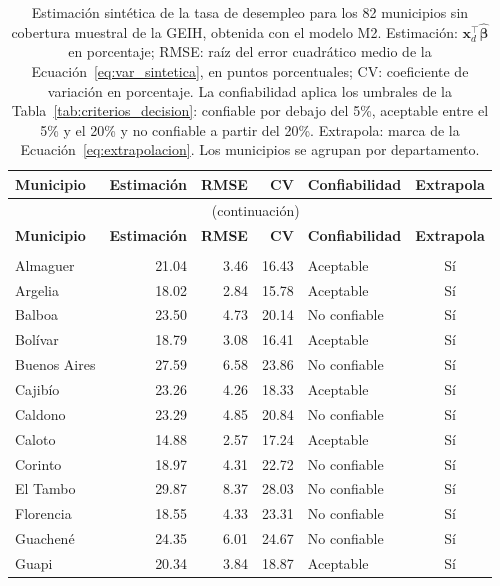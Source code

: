 \small
\begin{longtable}{p{3.4cm} r r r l c}
\caption{Estimación sintética de la tasa de desempleo para los 82 municipios sin cobertura
muestral de la GEIH, obtenida con el modelo M2. Estimación: $\mathbf{x}_d^\top\hat{\boldsymbol{\beta}}$
en porcentaje; RMSE: raíz del error cuadrático medio de la Ecuación~\ref{eq:var_sintetica}, en
puntos porcentuales; CV: coeficiente de variación en porcentaje. La confiabilidad aplica los
umbrales de la Tabla~\ref{tab:criterios_decision}: confiable por debajo del 5\%, aceptable entre el
5\% y el 20\% y no confiable a partir del 20\%. Extrapola: marca de la
Ecuación~\ref{eq:extrapolacion}. Los municipios se agrupan por departamento.}
\label{tab:prediccion_sintetica} \\
\toprule
\textbf{Municipio} & \textbf{Estimación} & \textbf{RMSE} & \textbf{CV} & \textbf{Confiabilidad} & \textbf{Extrapola} \\
\midrule
\endfirsthead
\multicolumn{6}{c}{\tablename\ \thetable{} (continuación)} \\
\toprule
\textbf{Municipio} & \textbf{Estimación} & \textbf{RMSE} & \textbf{CV} & \textbf{Confiabilidad} & \textbf{Extrapola} \\
\midrule
\endhead
\bottomrule
\endfoot
\bottomrule
\endlastfoot
\multicolumn{6}{l}{\textbf{Cauca}} \\
Almaguer & 21.04 & 3.46 & 16.43 & Aceptable & Sí \\
Argelia & 18.02 & 2.84 & 15.78 & Aceptable & Sí \\
Balboa & 23.50 & 4.73 & 20.14 & No confiable & Sí \\
Bolívar & 18.79 & 3.08 & 16.41 & Aceptable & Sí \\
Buenos Aires & 27.59 & 6.58 & 23.86 & No confiable & Sí \\
Cajibío & 23.26 & 4.26 & 18.33 & Aceptable & Sí \\
Caldono & 23.29 & 4.85 & 20.84 & No confiable & Sí \\
Caloto & 14.88 & 2.57 & 17.24 & Aceptable & Sí \\
Corinto & 18.97 & 4.31 & 22.72 & No confiable & Sí \\
El Tambo & 29.87 & 8.37 & 28.03 & No confiable & Sí \\
Florencia & 18.55 & 4.33 & 23.31 & No confiable & Sí \\
Guachené & 24.35 & 6.01 & 24.67 & No confiable & Sí \\
Guapi & 20.34 & 3.84 & 18.87 & Aceptable & Sí \\

\end{longtable}
